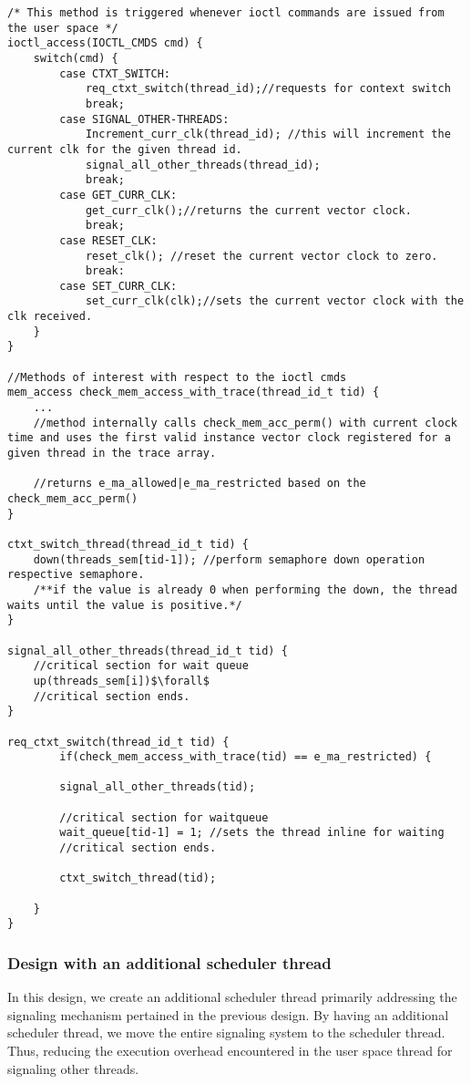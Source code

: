 \newpage
\begin{lstlisting}[title=Kernel Space - IOCTL, style=customc]
/* This method is triggered whenever ioctl commands are issued from the user space */
ioctl_access(IOCTL_CMDS cmd) {	
	switch(cmd) {
		case CTXT_SWITCH: 
			req_ctxt_switch(thread_id);//requests for context switch
			break;
		case SIGNAL_OTHER-THREADS:
			Increment_curr_clk(thread_id); //this will increment the current clk for the given thread id.
			signal_all_other_threads(thread_id);
			break;
		case GET_CURR_CLK:
			get_curr_clk();//returns the current vector clock.
			break;
		case RESET_CLK:
			reset_clk(); //reset the current vector clock to zero.
			break:		
		case SET_CURR_CLK:
			set_curr_clk(clk);//sets the current vector clock with the clk received.
	}
}

//Methods of interest with respect to the ioctl cmds
mem_access check_mem_access_with_trace(thread_id_t tid) {
	...
	//method internally calls check_mem_acc_perm() with current clock time and uses the first valid instance vector clock registered for a given thread in the trace array.
		
	//returns e_ma_allowed|e_ma_restricted based on the check_mem_acc_perm()
}

ctxt_switch_thread(thread_id_t tid) {	
	down(threads_sem[tid-1]); //perform semaphore down operation respective semaphore.
	/**if the value is already 0 when performing the down, the thread waits until the value is positive.*/
}

signal_all_other_threads(thread_id_t tid) {
	//critical section for wait queue
	up(threads_sem[i])$\forall$	
	//critical section ends.
}

req_ctxt_switch(thread_id_t tid) {
		if(check_mem_access_with_trace(tid) == e_ma_restricted) {

		signal_all_other_threads(tid);
		
		//critical section for waitqueue
		wait_queue[tid-1] = 1; //sets the thread inline for waiting
		//critical section ends.
		
		ctxt_switch_thread(tid);

	}
}

\end{lstlisting}

\subsubsection{Design with an additional scheduler thread}\label{sec_add_thread}

In this design, we create an additional scheduler thread primarily addressing the signaling mechanism pertained in the previous design. 
By having an additional scheduler thread, we move the entire signaling system to the scheduler thread.
Thus, reducing the execution overhead encountered in the user space thread for signaling other threads.

